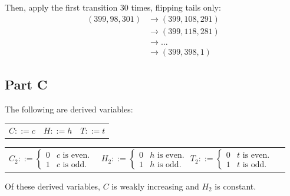 \documentclass{article}
\begin{document}
Then, apply the first transition 30 times, flipping tails only:
\begin{equation*}
  \begin{split}
    (399, 98, 301) &\longrightarrow (399, 108, 291) \\
                   &\longrightarrow (399, 118, 281) \\
                   &\longrightarrow \ldots \\
                   &\longrightarrow (399, 398, 1)
  \end{split}
\end{equation*}

\bigbreak
\bigbreak
\bigbreak
\bigbreak
\bigbreak
\bigbreak
\bigbreak
\bigbreak
\bigbreak
\bigbreak
\bigbreak
\bigbreak
\bigbreak
\bigbreak
\bigbreak
\bigbreak
\bigbreak
\bigbreak
\bigbreak
\bigbreak
\bigbreak
\bigbreak
\bigbreak
\bigbreak
\bigbreak
\bigbreak
\bigbreak

\subsection*{Part C}

The following are derived variables:

\begin{center}
  \begin{tabular}{ c c c }
    $C ::= c$ & $H ::= h$ & $T ::= t$
  \end{tabular}
\end{center}
\begin{center}
  \begin{tabular}{ c c c }
    $C_{2} ::= \begin{cases} 0 & c \textrm{ is even.} \\ 1 & c \textrm{ is odd.}
      \end{cases}$ & $H_{2} ::= \begin{cases} 0 & h \textrm{ is even.} \\ 1 & h
      \textrm{ is odd.} \end{cases}$ $T_{2} ::= \begin{cases} 0 & t \textrm{ is
      even.} \\ 1 & t \textrm{ is odd.} \end{cases}$
  \end{tabular}
\end{center}

Of these derived variables, $C$ is weakly increasing and $H_{2}$ is constant.

\bigbreak
\bigbreak
\bigbreak
\bigbreak
\bigbreak
\bigbreak
\bigbreak
\bigbreak
\bigbreak
\bigbreak
\bigbreak
\bigbreak
\bigbreak
\bigbreak
\bigbreak
\bigbreak
\bigbreak
\bigbreak
\bigbreak
\bigbreak
\bigbreak
\bigbreak
\bigbreak
\bigbreak
\bigbreak
\bigbreak
\bigbreak
\end{document}
